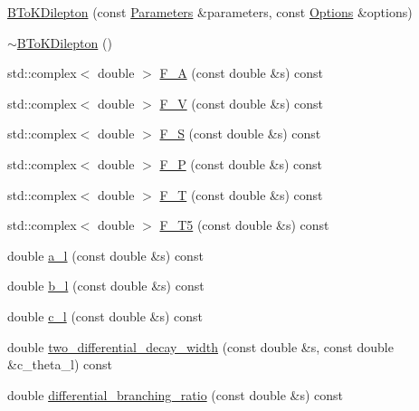 \begin{DoxyCompactItemize}
\item 
\hyperlink{classeos_1_1BToKDilepton_3_01LargeRecoil_01_4_ae24a0041ca988880b7835a61987a6c98}{BToKDilepton} (const \hyperlink{classeos_1_1Parameters}{Parameters} \&parameters, const \hyperlink{classeos_1_1Options}{Options} \&options)
\item 
\hyperlink{classeos_1_1BToKDilepton_3_01LargeRecoil_01_4_a8f7f6c37355d48b92dcf73127ce7b603}{$\sim$BToKDilepton} ()
\item 
std::complex$<$ double $>$ \hyperlink{classeos_1_1BToKDilepton_3_01LargeRecoil_01_4_a72e5db40a97d248d57b1ff22ab0ce78d}{F\_\-A} (const double \&s) const 
\item 
std::complex$<$ double $>$ \hyperlink{classeos_1_1BToKDilepton_3_01LargeRecoil_01_4_af59944944455c9411ba212f58976633a}{F\_\-V} (const double \&s) const 
\item 
std::complex$<$ double $>$ \hyperlink{classeos_1_1BToKDilepton_3_01LargeRecoil_01_4_a0da80045cac14ed85dcb306fe76b75c4}{F\_\-S} (const double \&s) const 
\item 
std::complex$<$ double $>$ \hyperlink{classeos_1_1BToKDilepton_3_01LargeRecoil_01_4_a6bcc1cc0fa58626da2f94b3dc3bbc8c4}{F\_\-P} (const double \&s) const 
\item 
std::complex$<$ double $>$ \hyperlink{classeos_1_1BToKDilepton_3_01LargeRecoil_01_4_a7b0d805213f319d4de219ba0333d25b6}{F\_\-T} (const double \&s) const 
\item 
std::complex$<$ double $>$ \hyperlink{classeos_1_1BToKDilepton_3_01LargeRecoil_01_4_ae4b7200f7f47324a77c729f620ef1858}{F\_\-T5} (const double \&s) const 
\item 
double \hyperlink{classeos_1_1BToKDilepton_3_01LargeRecoil_01_4_a2023c59cc447f5512b4d26b2859ec49a}{a\_\-l} (const double \&s) const 
\item 
double \hyperlink{classeos_1_1BToKDilepton_3_01LargeRecoil_01_4_a1a5b5dfaf3a249e4992af2d868d8b543}{b\_\-l} (const double \&s) const 
\item 
double \hyperlink{classeos_1_1BToKDilepton_3_01LargeRecoil_01_4_a7c773c2a61d0a009a5c3d5c10aa6c9c4}{c\_\-l} (const double \&s) const 
\item 
double \hyperlink{classeos_1_1BToKDilepton_3_01LargeRecoil_01_4_acc340e2646eb88b5709c12d520c06a2a}{two\_\-differential\_\-decay\_\-width} (const double \&s, const double \&c\_\-theta\_\-l) const 
\item 
double \hyperlink{classeos_1_1BToKDilepton_3_01LargeRecoil_01_4_a858a2f5d3589827abb3f221125ccc151}{differential\_\-branching\_\-ratio} (const double \&s) const 

\end{DoxyCompactItemize}
